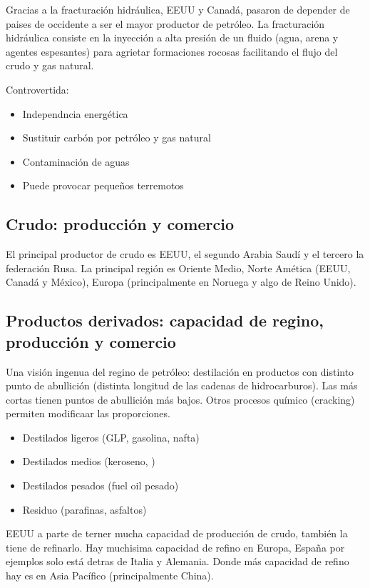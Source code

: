 Gracias a la fracturación hidráulica, EEUU y Canadá, pasaron de depender de paises de occidente a ser el mayor productor de petróleo. La fracturación hidráulica consiste en la inyección a alta presión de un fluido (agua, arena y agentes espesantes) para agrietar formaciones rocosas facilitando el flujo del crudo y gas natural. 

Controvertida:
\begin{itemize}
    \item Independncia energética
    \item Sustituir carbón por petróleo y gas natural
    \item Contaminación de aguas
    \item Puede provocar pequeños terremotos
\end{itemize}

\subsection{Crudo: producción y comercio}

El principal productor de crudo es EEUU, el segundo Arabia Saudí y el tercero la federación Rusa. La principal región es Oriente Medio, Norte Amética (EEUU, Canadá y México), Europa (principalmente en Noruega y algo de Reino Unido).

\subsection{Productos derivados: capacidad de regino, producción y comercio}

Una visión ingenua del regino de petróleo: destilación en productos con distinto punto de abullición (distinta longitud de las cadenas de hidrocarburos). Las más cortas tienen puntos de abullición más bajos. Otros procesos químico (cracking) permiten modificaar las proporciones.

\begin{itemize}
    \item Destilados ligeros (GLP, gasolina, nafta)
    \item Destilados medios (keroseno, )
    \item Destilados pesados (fuel oil pesado)
    \item Residuo (parafinas, asfaltos)
\end{itemize}

EEUU a parte de terner mucha capacidad de producción de crudo, también la tiene de refinarlo. Hay muchisima capacidad de refino en Europa, España por ejemplos solo está detras de Italia y Alemania. Donde más capacidad de refino hay es en Asia Pacífico (principalmente China).

